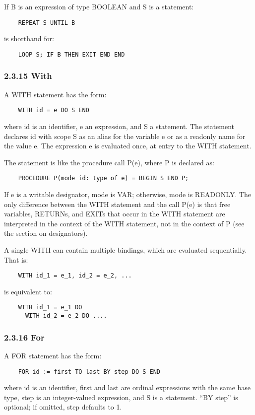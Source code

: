 \documentclass[10pt]{article}
\begin{document}
If B is an expression of type BOOLEAN and S is a statement:
\begin{verbatim}
    REPEAT S UNTIL B
\end{verbatim}
is shorthand for:
\begin{verbatim}
    LOOP S; IF B THEN EXIT END END
\end{verbatim}

\subsubsection*{2.3.15 With}

A WITH statement has the form:
\begin{verbatim}
    WITH id = e DO S END
\end{verbatim}
where id is an identifier, e an expression, and S a statement. The statement
declares id with scope S as an alias for the variable e or as a readonly name
for the value e. The expression e is evaluated once, at entry to the WITH
statement.

The statement is like the procedure call P(e), where P is declared as:
\begin{verbatim}
    PROCEDURE P(mode id: type of e) = BEGIN S END P;
\end{verbatim}
If e is a writable designator, mode is VAR; otherwise, mode is READONLY. The
only difference between the WITH statement and the call P(e) is that free
variables, RETURNs, and EXITs that occur in the WITH statement are interpreted
in the context of the WITH statement, not in the context of P (see the section
on designators).

A single WITH can contain multiple bindings, which are evaluated
sequentially. That is:
\begin{verbatim}
    WITH id_1 = e_1, id_2 = e_2, ...
\end{verbatim}
is equivalent to:
\begin{verbatim}
    WITH id_1 = e_1 DO
      WITH id_2 = e_2 DO ....
\end{verbatim}

\subsubsection*{2.3.16 For}

A FOR statement has the form:
\begin{verbatim}
    FOR id := first TO last BY step DO S END
\end{verbatim}
where id is an identifier, first and last are ordinal expressions with the
same base type, step is an integer-valued expression, and S is a
statement. ``BY step'' is optional; if omitted, step defaults to 1.
\end{document}
